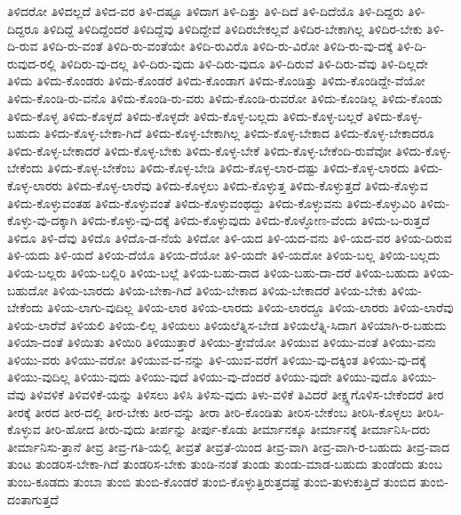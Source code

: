 {ತಿಳಿದರೋ
ತಿಳಿದಲ್ಲದೆ
ತಿಳಿದ-ವರ
ತಿಳಿ-ದಷ್ಟೂ
ತಿಳಿದಾಗ
ತಿಳಿ-ದಿತ್ತು
ತಿಳಿ-ದಿದೆ
ತಿಳಿ-ದಿದೆಯೊ
ತಿಳಿ-ದಿದ್ದರು
ತಿಳಿ-ದಿದ್ದರೂ
ತಿಳಿದಿದ್ದೆ
ತಿಳಿದಿದ್ದೆಂದರೆ
ತಿಳಿದಿದ್ದೆವು
ತಿಳಿದಿದ್ದೇವೆ
ತಿಳಿದಿರಬೇಕಲ್ಲವೆ
ತಿಳಿದಿರ-ಬೇಕಾಗಿಲ್ಲ
ತಿಳಿದಿರ-ಬೇಕು
ತಿಳಿ-ದಿ-ರುವ
ತಿಳಿದಿ-ರು-ವಂತೆ
ತಿಳಿದಿ-ರು-ವಂತೆಯೇ
ತಿಳಿದಿ-ರುವಿರೊ
ತಿಳಿದಿ-ರು-ವಿರೋ
ತಿಳಿದಿ-ರು-ವು-ದಕ್ಕೆ
ತಿಳಿ-ದಿ-ರುವುದ-ರಲ್ಲಿ
ತಿಳಿದಿರು-ವು-ದಲ್ಲ
ತಿಳಿ-ದಿರು-ವುದು
ತಿಳಿ-ದಿರು-ವುದೂ
ತಿಳಿ-ದಿರುವೆ
ತಿಳಿ-ದಿರು-ವೆವು
ತಿಳಿ-ದಿಲ್ಲದೇ
ತಿಳಿದು
ತಿಳಿದು-ಕೊಂಡರು
ತಿಳಿದು-ಕೊಂಡರೆ
ತಿಳಿದು-ಕೊಂಡಾಗ
ತಿಳಿದು-ಕೊಂಡಿತ್ತು
ತಿಳಿದು-ಕೊಂಡಿದ್ದೇ-ವೆಯೋ
ತಿಳಿದು-ಕೊಂಡಿ-ರು-ವನೊ
ತಿಳಿದು-ಕೊಂಡಿ-ರು-ವರು
ತಿಳಿದು-ಕೊಂಡಿ-ರುವರೋ
ತಿಳಿದು-ಕೊಂಡಿಲ್ಲ
ತಿಳಿದು-ಕೊಂಡು
ತಿಳಿದು-ಕೊಳ್ಳ
ತಿಳಿದು-ಕೊಳ್ಳದೆ
ತಿಳಿದು-ಕೊಳ್ಳದೇ
ತಿಳಿದು-ಕೊಳ್ಳ-ಬಲ್ಲದು
ತಿಳಿದು-ಕೊಳ್ಳ-ಬಲ್ಲರೆ
ತಿಳಿದು-ಕೊಳ್ಳ-ಬಹುದು
ತಿಳಿದು-ಕೊಳ್ಳ-ಬೇಕಾ-ಗಿದೆ
ತಿಳಿದು-ಕೊಳ್ಳ-ಬೇಕಾಗಿಲ್ಲ
ತಿಳಿದು-ಕೊಳ್ಳ-ಬೇಕಾದ
ತಿಳಿದು-ಕೊಳ್ಳ-ಬೇಕಾದರೂ
ತಿಳಿದು-ಕೊಳ್ಳ-ಬೇಕಾದರೆ
ತಿಳಿದು-ಕೊಳ್ಳ-ಬೇಕು
ತಿಳಿದು-ಕೊಳ್ಳ-ಬೇಕೆ
ತಿಳಿದು-ಕೊಳ್ಳ-ಬೇಕೆಂದಿ-ರುವೆವೋ
ತಿಳಿದು-ಕೊಳ್ಳ-ಬೇಕೆಂದು
ತಿಳಿದು-ಕೊಳ್ಳ-ಬೇಕೆಂಬ
ತಿಳಿದು-ಕೊಳ್ಳ-ಬೇಡಿ
ತಿಳಿದು-ಕೊಳ್ಳ-ಲಾರ-ದಷ್ಟು
ತಿಳಿದು-ಕೊಳ್ಳ-ಲಾರದು
ತಿಳಿದು-ಕೊಳ್ಳ-ಲಾರರು
ತಿಳಿದು-ಕೊಳ್ಳ-ಲಾರೆವು
ತಿಳಿದು-ಕೊಳ್ಳಲು
ತಿಳಿದು-ಕೊಳ್ಳುತ್ತ
ತಿಳಿದು-ಕೊಳ್ಳುತ್ತದೆ
ತಿಳಿದು-ಕೊಳ್ಳುವ
ತಿಳಿದು-ಕೊಳ್ಳುವಂತಹ
ತಿಳಿದು-ಕೊಳ್ಳುವಂತೆ
ತಿಳಿದು-ಕೊಳ್ಳುವಂಥದ್ದು
ತಿಳಿದು-ಕೊಳ್ಳುವನು
ತಿಳಿದು-ಕೊಳ್ಳುವಿರಿ
ತಿಳಿದು-ಕೊಳ್ಳು-ವು-ದಕ್ಕಾಗಿ
ತಿಳಿದು-ಕೊಳ್ಳು-ವು-ದಕ್ಕೆ
ತಿಳಿದು-ಕೊಳ್ಳುವುದು
ತಿಳಿದು-ಕೊಳ್ಳೋಣ-ವೆಂದು
ತಿಳಿದು-ಬ-ರುತ್ತದೆ
ತಿಳಿದೂ
ತಿಳಿ-ದೆವು
ತಿಳಿದೊ
ತಿಳಿದೊ-ಡ-ನೆಯೆ
ತಿಳಿದೋ
ತಿಳಿ-ಯದ
ತಿಳಿ-ಯದ-ವನು
ತಿಳಿ-ಯದ-ವರ
ತಿಳಿಯ-ದಿರುವ
ತಿಳಿ-ಯದು
ತಿಳಿ-ಯದೆ
ತಿಳಿಯ-ದೆಯೊ
ತಿಳಿಯ-ದೆಯೋ
ತಿಳಿ-ಯದೇ
ತಿಳಿ-ಯದೋ
ತಿಳಿಯ-ಬಲ್ಲ
ತಿಳಿಯ-ಬಲ್ಲದು
ತಿಳಿಯ-ಬಲ್ಲರು
ತಿಳಿಯ-ಬಲ್ಲಿರಿ
ತಿಳಿಯ-ಬಲ್ಲೆ
ತಿಳಿಯ-ಬಹು-ದಾದ
ತಿಳಿಯ-ಬಹು-ದಾ-ದರೆ
ತಿಳಿಯ-ಬಹುದು
ತಿಳಿಯ-ಬಹುದೋ
ತಿಳಿಯ-ಬಾರದು
ತಿಳಿಯ-ಬೇಕಾ-ಗಿದೆ
ತಿಳಿಯ-ಬೇಕಾದ
ತಿಳಿಯ-ಬೇಕಾದರೆ
ತಿಳಿಯ-ಬೇಕು
ತಿಳಿಯ-ಬೇಕೆಂದು
ತಿಳಿಯ-ಲಾಗು-ವುದಿಲ್ಲ
ತಿಳಿಯ-ಲಾರ
ತಿಳಿಯ-ಲಾರದು
ತಿಳಿಯ-ಲಾರದ್ದೂ
ತಿಳಿಯ-ಲಾರರು
ತಿಳಿಯ-ಲಾರೆವು
ತಿಳಿಯ-ಲಾರೆವೆ
ತಿಳಿಯಲಿ
ತಿಳಿಯ-ಲಿಲ್ಲ
ತಿಳಿಯಲು
ತಿಳಿಯಲೆತ್ನಿಸ-ಬೇಡ
ತಿಳಿಯಲೆತ್ನಿ-ಸಿದಾಗ
ತಿಳಿಯಾಗಿ-ರ-ಬಹುದು
ತಿಳಿಯಾ-ದಂತೆ
ತಿಳಿಯಿತು
ತಿಳಿಯಿರಿ
ತಿಳಿಯುತ್ತಾರೆ
ತಿಳಿಯು-ತ್ತೇವೆಯೋ
ತಿಳಿಯುವ
ತಿಳಿಯು-ವಂತೆ
ತಿಳಿಯು-ವನು
ತಿಳಿಯು-ವರು
ತಿಳಿಯು-ವರೋ
ತಿಳಿಯುವ-ವ-ನನ್ನು
ತಿಳಿ-ಯುವ-ವರೆಗೆ
ತಿಳಿಯು-ವು-ದಕ್ಕಿಂತ
ತಿಳಿಯು-ವು-ದಕ್ಕೆ
ತಿಳಿಯು-ವುದಿಲ್ಲ
ತಿಳಿಯು-ವುದು
ತಿಳಿಯು-ವುದೆ
ತಿಳಿಯು-ವು-ದೆಂದರೆ
ತಿಳಿಯು-ವುದೇ
ತಿಳಿಯು-ವುದೊ
ತಿಳಿಯು-ವೆವು
ತಿಳಿವಳಿಕೆ
ತಿಳಿವಳಿಕೆ-ಯನ್ನು
ತಿಳಿಸಲು
ತಿಳಿಸಿ
ತಿಳಿಸು-ವುದು
ತಿಳು-ವಳಿಕೆ
ತಿವಿದರೆ
ತೀಕ್ಷ್ಣಗೊಳಿಸ-ಬೇಕೆಂದರೆ
ತೀರ
ತೀರಕ್ಕೆ
ತೀರದ
ತೀರ-ದಲ್ಲಿ
ತೀರ-ಬೇಕು
ತೀರ-ವನ್ನು
ತೀರಾ
ತೀರಿ-ಕೊಂಡಿತು
ತೀರಿಸ-ಬೇಕೆಂಬ
ತೀರಿಸಿ-ಕೊಳ್ಳಲು
ತೀರಿಸಿ-ಕೊಳ್ಳುವ
ತೀರಿ-ಹೋದ
ತೀರು-ವುದು
ತೀರ್ಪನ್ನು
ತೀರ್ಪು-ಕೊಡು
ತೀರ್ಮಾನಕ್ಕೂ
ತೀರ್ಮಾನಕ್ಕೆ
ತೀರ್ಮಾನಿಸಿ-ದರು
ತೀರ್ಮಾನಿಸು-ತ್ತಾನೆ
ತೀವ್ರ
ತೀವ್ರ-ಗತಿ-ಯಲ್ಲಿ
ತೀವ್ರತೆ
ತೀವ್ರತೆ-ಯಿಂದ
ತೀವ್ರ-ವಾಗಿ
ತೀವ್ರ-ವಾಗಿ-ರ-ಬಹುದು
ತೀವ್ರ-ವಾದ
ತುಂಟ
ತುಂಡರಿಸ-ಬೇಕಾ-ಗಿದೆ
ತುಂಡರಿಸ-ಬೇಕು
ತುಂಡಿ-ನಂತೆ
ತುಂಡು
ತುಂಡು-ಮಾಡ-ಬಹುದು
ತುಂಡೆಂದು
ತುಂಬ
ತುಂಬ-ಕೂಡದು
ತುಂಬಾ
ತುಂಬಿ
ತುಂಬಿ-ಕೊಂಡರೆ
ತುಂಬಿ-ಕೊಳ್ಳುತ್ತಿರುತ್ತದಷ್ಟೆ
ತುಂಬಿ-ತುಳುಕುತ್ತಿದೆ
ತುಂಬಿದ
ತುಂಬಿ-ದಂತಾಗುತ್ತದೆ
}
